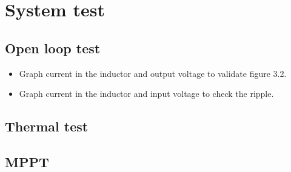 \section{System test}


\subsection{Open loop test}

\begin{itemize}
	\item Graph current in the inductor and output voltage to validate figure 3.2. 
	\item Graph current in the inductor and input voltage to check the ripple. 
\end{itemize}

\subsection{Thermal test}

\subsection{MPPT}

